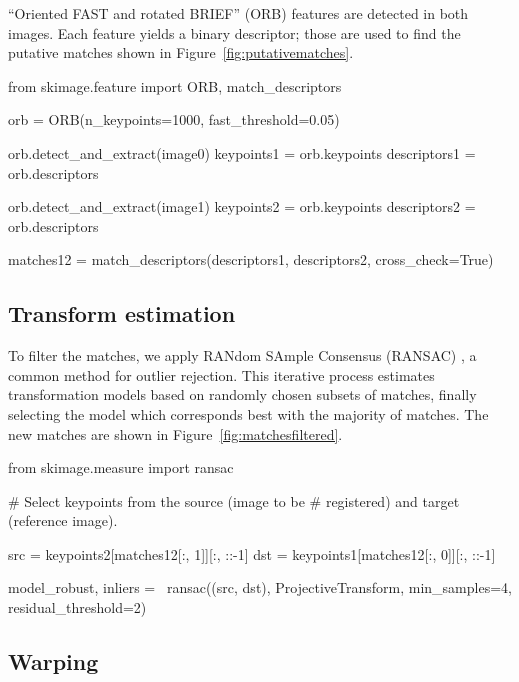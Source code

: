     ``Oriented FAST and rotated BRIEF'' (ORB) features \citep{ORB} are detected in both images. Each feature yields a binary descriptor; those are used to find the putative matches shown in Figure~\ref{fig:putativematches}.

    \begin{pyverbatim}
      from skimage.feature import ORB, match_descriptors

      orb = ORB(n_keypoints=1000, fast_threshold=0.05)

      orb.detect_and_extract(image0)
      keypoints1 = orb.keypoints
      descriptors1 = orb.descriptors

      orb.detect_and_extract(image1)
      keypoints2 = orb.keypoints
      descriptors2 = orb.descriptors

      matches12 = match_descriptors(descriptors1,
                                    descriptors2,
                                    cross_check=True)
    \end{pyverbatim}

  \subsection{Transform estimation}
    \label{sub:transform_estimation}

    To filter the matches, we apply RANdom SAmple Consensus (RANSAC) \citep{ransac}, a common method for outlier rejection. This iterative process estimates transformation models based on randomly chosen subsets of matches, finally selecting the model which corresponds best with the majority of matches. The new matches are shown in Figure~\ref{fig:matchesfiltered}.

    \begin{pyverbatim}
      from skimage.measure import ransac

      # Select keypoints from the source (image to be
      # registered) and target (reference image).

      src = keypoints2[matches12[:, 1]][:, ::-1]
      dst = keypoints1[matches12[:, 0]][:, ::-1]

      model_robust, inliers = \
          ransac((src, dst), ProjectiveTransform,
                 min_samples=4, residual_threshold=2)
    \end{pyverbatim}

  \subsection{Warping}
    \label{sub:warping}

